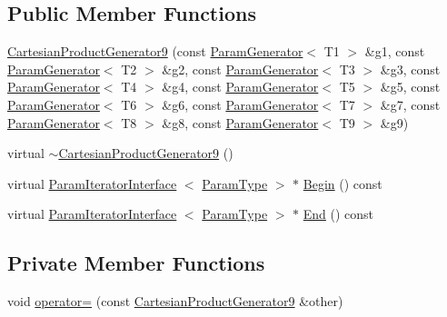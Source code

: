 \subsection*{\-Public \-Member \-Functions}
\begin{DoxyCompactItemize}
\item 
\hyperlink{classtesting_1_1internal_1_1CartesianProductGenerator9_a0fe9e6810c5efc7042697af9b9f66c34}{\-Cartesian\-Product\-Generator9} (const \hyperlink{classtesting_1_1internal_1_1ParamGenerator}{\-Param\-Generator}$<$ \-T1 $>$ \&g1, const \hyperlink{classtesting_1_1internal_1_1ParamGenerator}{\-Param\-Generator}$<$ \-T2 $>$ \&g2, const \hyperlink{classtesting_1_1internal_1_1ParamGenerator}{\-Param\-Generator}$<$ \-T3 $>$ \&g3, const \hyperlink{classtesting_1_1internal_1_1ParamGenerator}{\-Param\-Generator}$<$ \-T4 $>$ \&g4, const \hyperlink{classtesting_1_1internal_1_1ParamGenerator}{\-Param\-Generator}$<$ \-T5 $>$ \&g5, const \hyperlink{classtesting_1_1internal_1_1ParamGenerator}{\-Param\-Generator}$<$ \-T6 $>$ \&g6, const \hyperlink{classtesting_1_1internal_1_1ParamGenerator}{\-Param\-Generator}$<$ \-T7 $>$ \&g7, const \hyperlink{classtesting_1_1internal_1_1ParamGenerator}{\-Param\-Generator}$<$ \-T8 $>$ \&g8, const \hyperlink{classtesting_1_1internal_1_1ParamGenerator}{\-Param\-Generator}$<$ \-T9 $>$ \&g9)
\item 
virtual \hyperlink{classtesting_1_1internal_1_1CartesianProductGenerator9_a578d4cf9061e7bb86daebb1615a2b953}{$\sim$\-Cartesian\-Product\-Generator9} ()
\item 
virtual \hyperlink{classtesting_1_1internal_1_1ParamIteratorInterface}{\-Param\-Iterator\-Interface}\*
$<$ \hyperlink{classtesting_1_1internal_1_1CartesianProductGenerator9_a311b2d1d5a489d4841f258a70f33bf9d}{\-Param\-Type} $>$ $\ast$ \hyperlink{classtesting_1_1internal_1_1CartesianProductGenerator9_ab6a1e6ee0c9095fec4ca7dd2fe9736cd}{\-Begin} () const 
\item 
virtual \hyperlink{classtesting_1_1internal_1_1ParamIteratorInterface}{\-Param\-Iterator\-Interface}\*
$<$ \hyperlink{classtesting_1_1internal_1_1CartesianProductGenerator9_a311b2d1d5a489d4841f258a70f33bf9d}{\-Param\-Type} $>$ $\ast$ \hyperlink{classtesting_1_1internal_1_1CartesianProductGenerator9_a2175654afa23856e885489861c353c72}{\-End} () const 
\end{DoxyCompactItemize}
\subsection*{\-Private \-Member \-Functions}
\begin{DoxyCompactItemize}
\item 
void \hyperlink{classtesting_1_1internal_1_1CartesianProductGenerator9_a4dcbcb1a3cdebb8ccb96e3a45be27186}{operator=} (const \hyperlink{classtesting_1_1internal_1_1CartesianProductGenerator9}{\-Cartesian\-Product\-Generator9} \&other)
\end{DoxyCompactItemize}
